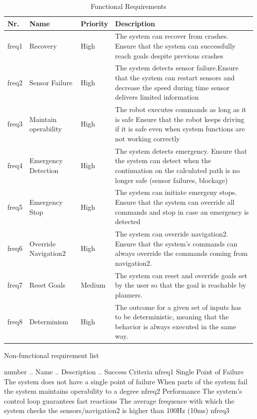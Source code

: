 \begin{table}[h!]
\caption{Functional Requirements}
	\begin{tabular}{ | m{} | m{}| m{} | m{} |} 
  	\hline
  	Nr. & Name & Priority & Description \\ 
  	\hline
  	freq1 & Recovery & High &  The system can recover from crashes. Ensure that the system can successfully reach goals despite previous crashes\\ 
  	\hline
  	freq2 & Sensor Failure & High & The system detects sensor failure.Ensure that the system can restart sensors and decrease the speed during time sensor delivers limited information \\ 
  	\hline
  	freq3 & Maintain operability & High & The robot executes commands as long as it is safe	Ensure that the robot keeps driving if it is safe even when system functions are not working correctly \\
  	\hline
  	freq4 & Emergency Detection & High & The system detects emergency. Ensure that the system can detect when the continuation on the calculated path is no longer safe (sensor failures, blockage) \\
  	\hline
  	freq5 & Emergency Stop & High & The system can initiate emergeny stops. Ensure that the system can override all commands and stop in case an emergency is detected \\
  	\hline
  	freq6 & Override Navigation2 & High & The system can override navigation2. Ensure that the system's commands can always override the commands coming from navigation2. \\
  	\hline
  	freq7 & Reset Goals & Medium & The system can reset and override goals set by the user so that the goal is reachable by planners. \\
  	\hline
  	freq8 & Determinism & High & The outcome for a given set of inputs has to be deterministic, meaning that the behavior is always executed in the same way. \\
  	\hline
  	
  	
	\end{tabular}
\end{table}
Non-functional requirement list

number .. 	Name .. 				Description ..										Success Criteria
nfreq1 Single Point of Failure	The system does not have a single point of failure	When parts of the system fail the system maintains operability to a degree
nfreq2 Performance	The system's control loop guarantees fast reactions	The average frequence with which the system checks the sensors/navigation2 is higher than 100Hz (10ms)
nfreq3

